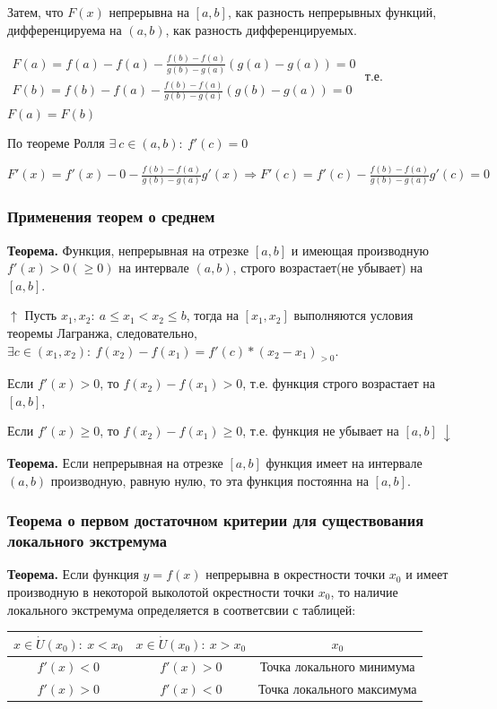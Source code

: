 \documentclass{article}
\begin{document}
Затем, что \(F(x)\) непрерывна на \([a, b]\), как разность непрерывных функций, дифференцируема на \((a, b)\), как разность дифференцируемых.

\(\begin{array}{l}
    F(a) = f(a) - f(a) - \frac{f(b)-f(a)}{g(b)-g(a)}(g(a)-g(a)) = 0\\
    F(b) = f(b) - f(a) - \frac{f(b)-f(a)}{g(b)-g(a)}(g(b)-g(a)) = 0
\end{array}\)
т.е. \(F(a) = F(b)\)

По теореме Ролля \(\exists\ c \in (a, b):\ f'(c) = 0\)

\(F'(x) = f'(x) - 0 - \frac{f(b) - f(a)}{g(b) - g(a)}g'(x) \Rightarrow F'(c) = f'(c) - \frac{f(b) - f(a)}{g(b) - g(a)}g'(c)=0\)

\subsubsection{Применения теорем о среднем}

\textbf{Теорема.} Функция, непрерывная на отрезке \([a, b]\) и имеющая производную \(f'(x) > 0(\geq 0)\) на интервале \((a, b)\), строго возрастает(не убывает) на \([a, b]\).

\(\uparrow\) Пусть \(x_1, x_2:\ a \leq x_1 < x_2 \leq b\), тогда на \([x_1, x_2]\) выполняются условия теоремы Лагранжа, следовательно, \(\exists c \in (x_1, x_2):\ f(x_2) - f(x_1) = f'(c)*(x_2 - x_1)_{>0}\).

Если \(f'(x) > 0\), то \(f(x_2) - f(x_1) > 0\), т.е. функция строго возрастает на \([a, b]\),

Если \(f'(x) \geq 0\), то \(f(x_2) - f(x_1) \geq 0\), т.е. функция не убывает на \([a, b]\ \downarrow\)

\textbf{Теорема.} Если непрерывная на отрезке \([a, b]\) функция имеет на интервале \((a, b)\) производную, равную нулю, то эта функция постоянна на \([a, b]\).

\subsubsection{Теорема о первом достаточном критерии для существования локального экстремума}

\textbf{Теорема.} Если функция \(y=f(x)\) непрерывна в окрестности точки \(x_0\) и имеет производную в некоторой выколотой окрестности точки \(x_0\), то наличие локального экстремума определяется в соответсвии с таблицей:

\begin{tabular}{ | c | c | c | }
    \hline
    \(x \in \dot{U}(x_0):\ x < x_0\) & \(x \in \dot{U}(x_0):\ x > x_0\) & \(x_0\)\\ [4.5pt]\hline
    \(f'(x) < 0\) & \(f'(x) > 0\) & Точка локального минимума\\[4.5pt] \hline
    \(f'(x) > 0\) & \(f'(x) < 0\) & Точка локального максимума\\ [4.5pt]\hline
\end{tabular}
\end{document}
